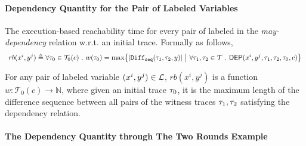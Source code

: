 \paragraph{Dependency Quantity for the Pair of Labeled Variables}
%
\begin{defn}
  \label{def:adapt-depvar_reachability}
  The execution-based reachability time for every pair of 
  labeled in the
  \emph{may-dependency} relation w.r.t. an initial trace. Formally as follows,
    \[
    \begin{array}{l}
        rb(x^i, y^j) \triangleq 
\forall \trace_0 \in \mathcal{T}_0(c) \sthat
  w (\trace_0) = \max \left\{ | \sdiff(\trace_1, \trace_2, y)|
  ~\middle\vert~
  \forall \trace_1, \trace_2 \in \mathcal{T} \sthat \dep(x^i, y^j,\trace_1, \trace_2, \trace_0, c) \right\}
\end{array}
\]
\end{defn}
%
For any pair of labeled variable $(x^i, y^j) \in \mathcal{L}$, 
$ rb(x^i, y^j)$ is a function $w: \mathcal{T}_0(c) \to \mathbb{N}$,
    where given an initial trace $\mathtt{\tau}_0$,
    it is the maximum length of the difference sequence between all pairs of the witness traces $\mathtt{\tau}_1, \mathtt{\tau}_2$ 
    satisfying the dependency relation.


\paragraph*{The Dependency Quantity through The Two Rounds Example}
